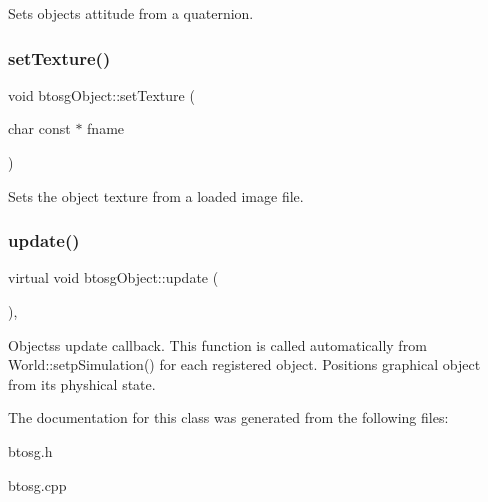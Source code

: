 Sets objects attitude from a quaternion. \mbox{\label{classbtosgObject_aff54acbc7c66811efb0cf2838107a241}} 
\subsubsection{\texorpdfstring{set\+Texture()}{setTexture()}}
{\footnotesize\ttfamily void btosg\+Object\+::set\+Texture (\begin{DoxyParamCaption}\item[{char const $\ast$}]{fname }\end{DoxyParamCaption})}

Sets the object texture from a loaded image file. \mbox{\label{classbtosgObject_a342917817dfde62554f83da8e0d5110b}} 
\subsubsection{\texorpdfstring{update()}{update()}}
{\footnotesize\ttfamily virtual void btosg\+Object\+::update (\begin{DoxyParamCaption}{ }\end{DoxyParamCaption})\hspace{0.3cm}{\ttfamily [inline]}, {\ttfamily [virtual]}}

Objects\textquotesingle{}s update callback. This function is called automatically from World\+::setp\+Simulation() for each registered object. Positions graphical object from its physhical state. 

The documentation for this class was generated from the following files\+:\begin{DoxyCompactItemize}
\item 
btosg.\+h\item 
btosg.\+cpp\end{DoxyCompactItemize}

